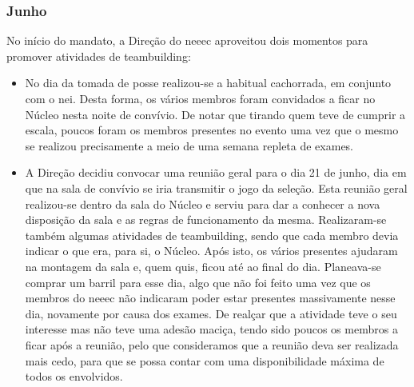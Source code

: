
\subsubsection{Junho}

No início do mandato, a Direção do \acrshort{neeec} aproveitou dois momentos para promover atividades de teambuilding:
\begin{itemize}
\item No dia da tomada de posse realizou-se a habitual cachorrada, em conjunto com o \acrshort{nei}. Desta forma, os vários membros foram convidados a ficar no Núcleo nesta noite de convívio. De notar que tirando quem teve de cumprir a escala, poucos foram os membros presentes no evento uma vez que o mesmo se realizou precisamente a meio de uma semana repleta de exames.
\item A Direção decidiu convocar uma reunião geral para o dia 21 de junho, dia em que na sala de convívio se iria transmitir o jogo da seleção. Esta reunião geral realizou-se dentro da sala do Núcleo e serviu para dar a conhecer a nova disposição da sala e as regras de funcionamento da mesma. Realizaram-se também algumas atividades de teambuilding, sendo que cada membro devia indicar o que era, para si, o Núcleo. Após isto, os vários presentes ajudaram na montagem da sala e, quem quis, ficou até ao final do dia. Planeava-se comprar um barril para esse dia, algo que não foi feito uma vez que os membros do \acrshort{neeec} não indicaram poder estar presentes massivamente nesse dia, novamente por causa dos exames. De realçar que a atividade teve o seu interesse mas não teve uma adesão maciça, tendo sido poucos os membros a ficar após a reunião, pelo que consideramos que a reunião deva ser realizada mais cedo, para que se possa contar com uma disponibilidade máxima de todos os envolvidos.
\end{itemize}